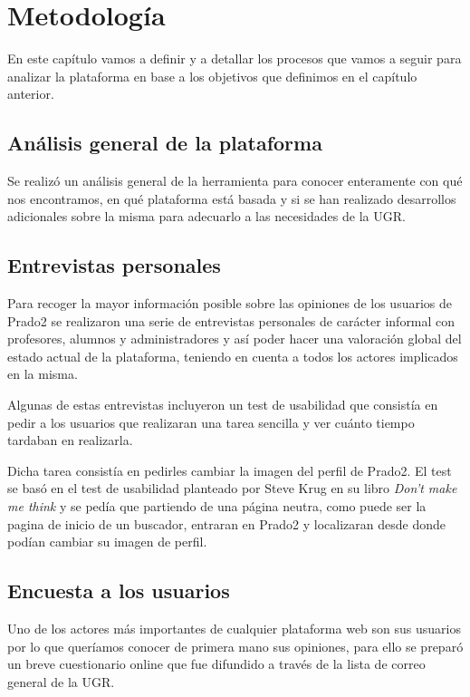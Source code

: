 \chapter{Metodología}

En este capítulo vamos a definir y a detallar los procesos que vamos a seguir para analizar la plataforma en base a los objetivos que definimos en el capítulo anterior.

\section{Análisis general de la plataforma}
Se realizó un análisis general de la herramienta para conocer enteramente con qué nos encontramos, en qué plataforma está basada y si se han realizado desarrollos adicionales sobre la misma para adecuarlo a las necesidades de la UGR.

\section{Entrevistas personales}

Para recoger la mayor información posible sobre las opiniones de los usuarios de Prado2 se realizaron una serie de entrevistas personales de carácter informal con profesores, alumnos y administradores y así poder hacer una valoración global del estado actual de la plataforma, teniendo en cuenta a todos los actores implicados en la misma.

\bigskip
Algunas de estas entrevistas incluyeron un test de usabilidad que consistía en pedir a los usuarios que realizaran una tarea sencilla y ver cuánto tiempo tardaban en realizarla. 

\bigskip
Dicha tarea consistía en pedirles cambiar la imagen del perfil de Prado2. El test se basó en el test de usabilidad planteado por Steve Krug en su libro \textit{Don't make me think} \cite{stevekrug} y se pedía que partiendo de una página neutra, como puede ser la pagina de inicio de un buscador, entraran en Prado2 y localizaran desde donde podían cambiar su imagen de perfil.


\section{Encuesta a los usuarios}
Uno de los actores más importantes de cualquier plataforma web son sus usuarios por lo que queríamos conocer de primera mano sus opiniones, para ello se preparó un breve cuestionario online que fue difundido a través de la lista de correo general de la UGR.

